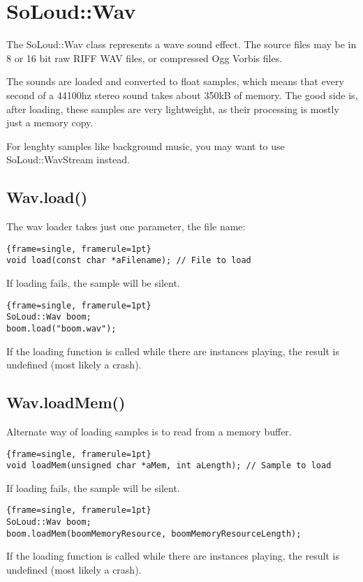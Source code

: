 
\chapter{SoLoud::Wav}

The SoLoud::Wav class represents a wave sound effect. The source files may be in 8 or 16 bit raw RIFF WAV files, or compressed Ogg Vorbis files.

The sounds are loaded and converted to float samples, which means that every second of a 44100hz stereo sound takes about 350kB of memory. The good side is, after loading, these samples are very lightweight, as their processing is mostly just a memory copy.

For lenghty samples like background music, you may want to use SoLoud::WavStream instead.

\section{Wav.load()}

The wav loader takes just one parameter, the file name:

\begin{lstlisting}{frame=single, framerule=1pt}
void load(const char *aFilename); // File to load
\end{lstlisting}

If loading fails, the sample will be silent.

\begin{lstlisting}{frame=single, framerule=1pt}
SoLoud::Wav boom;
boom.load("boom.wav");
\end{lstlisting}

If the loading function is called while there are instances playing, the result is undefined (most likely a crash).

\section{Wav.loadMem()}

Alternate way of loading samples is to read from a memory buffer.

\begin{lstlisting}{frame=single, framerule=1pt}
void loadMem(unsigned char *aMem, int aLength); // Sample to load
\end{lstlisting}

If loading fails, the sample will be silent.

\begin{lstlisting}{frame=single, framerule=1pt}
SoLoud::Wav boom;
boom.loadMem(boomMemoryResource, boomMemoryResourceLength);
\end{lstlisting}

If the loading function is called while there are instances playing, the result is undefined (most likely a crash).
